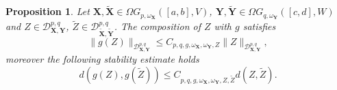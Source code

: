 \documentclass[10pt,a4paper]{amsart}
\newtheorem{proposition}{Proposition}
\begin{document}
\begin{proposition}\label{stability_proposition}
    Let $\mathbf{X}, \tilde{\mathbf{X}} \in \Omega G_{p, \omega_\mathbf{X}}([a,b], V)$, $\mathbf{Y}, \tilde{\mathbf{Y}} \in \Omega G_{q, \omega_\mathbf{Y}}([c,d], W)$ and  $Z \in \mathcal{D}^{p,q}_{\mathbf{X},\mathbf{Y}}$, $\tilde{Z} \in \mathcal{D}^{p,q}_{\tilde{\mathbf{X}},\tilde{\mathbf{Y}}}$. The composition of $Z$ with $g$ satisfies 
    \[
    \|g(Z)\|_{\mathcal{D}^{p,q}_{\mathbf{X}, \mathbf{Y}}} \leq C_{p,q,g,\omega_\mathbf{X}, \omega_\mathbf{Y}, Z} \|Z\|_{\mathcal{D}^{p,q}_{\mathbf{X}, \mathbf{Y}}},
    \]
    moreover the following stability estimate holds
    \[
    d(g(Z), g(\tilde{Z})) \leq C_{p,q,g,\omega_\mathbf{X}, \omega_\mathbf{Y}, Z, \tilde{Z}} d(Z, \tilde{Z}).
    \]


\end{proposition}
\end{document}
